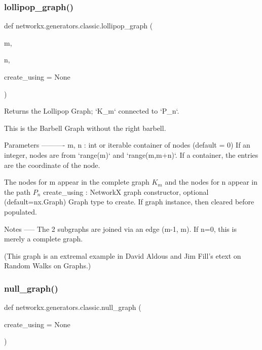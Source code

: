 \subsubsection{\texorpdfstring{lollipop\+\_\+graph()}{lollipop\_graph()}}
{\footnotesize\ttfamily def networkx.\+generators.\+classic.\+lollipop\+\_\+graph (\begin{DoxyParamCaption}\item[{}]{m,  }\item[{}]{n,  }\item[{}]{create\+\_\+using = {\ttfamily None} }\end{DoxyParamCaption})}

\begin{DoxyVerb}Returns the Lollipop Graph; `K_m` connected to `P_n`.

This is the Barbell Graph without the right barbell.

Parameters
----------
m, n : int or iterable container of nodes (default = 0)
    If an integer, nodes are from `range(m)` and `range(m,m+n)`.
    If a container, the entries are the coordinate of the node.

    The nodes for m appear in the complete graph $K_m$ and the nodes
    for n appear in the path $P_n$
create_using : NetworkX graph constructor, optional (default=nx.Graph)
   Graph type to create. If graph instance, then cleared before populated.

Notes
-----
The 2 subgraphs are joined via an edge (m-1, m).
If n=0, this is merely a complete graph.

(This graph is an extremal example in David Aldous and Jim
Fill's etext on Random Walks on Graphs.)\end{DoxyVerb}
 \mbox{\label{namespacenetworkx_1_1generators_1_1classic_a6a0556de2c6a97a6614334c0a5830644}} 
\subsubsection{\texorpdfstring{null\+\_\+graph()}{null\_graph()}}
{\footnotesize\ttfamily def networkx.\+generators.\+classic.\+null\+\_\+graph (\begin{DoxyParamCaption}\item[{}]{create\+\_\+using = {\ttfamily None} }\end{DoxyParamCaption})}

